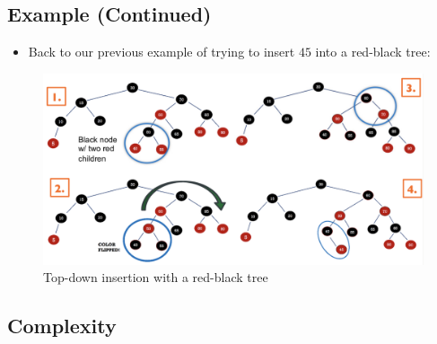 \documentclass[
  10pt,
  english,
  letterpaper,
,tablecaptionabove
]{scrartcl}
\providecommand{\tightlist}{%
  \setlength{\itemsep}{0pt}\setlength{\parskip}{0pt}}
\begin{document}
\hypertarget{example-continued}{%
\subsection{Example (Continued)}\label{example-continued}}

\begin{itemize}
\tightlist
\item
  Back to our previous example of trying to insert \(45\) into a
  red-black tree:
\end{itemize}

\begin{figure}
\centering
\includegraphics[width=1\textwidth,height=\textheight]{images/7.png}
\caption{Top-down insertion with a red-black tree}
\end{figure}

\hypertarget{complexity}{%
\subsection{Complexity}\label{complexity}}
\end{document}
